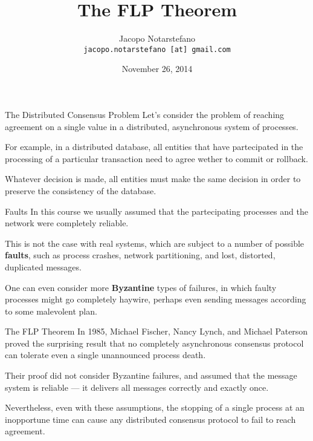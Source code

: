 \documentclass[12pt]{beamer}
\title{The FLP Theorem}
\author[Jacopo Notarstefano]{
  Jacopo Notarstefano\\
  \texttt{jacopo.notarstefano [at] gmail.com}
}
\date{November 26, 2014}
\begin{document}
  \begin{frame}[plain]
    \titlepage
  \end{frame}

  \begin{frame}{The Distributed Consensus Problem}
    Let's consider the problem of reaching agreement on a single value in a distributed, asynchronous system of processes.

    \vspace{0.25cm}

    For example, in a distributed database, all entities that have partecipated in the processing of a particular transaction need to agree wether to commit or rollback.

    \vspace{0.25cm}

    Whatever decision is made, all entities must make the same decision in order to preserve the consistency of the database.
  \end{frame}

  \begin{frame}{Faults}
    In this course we usually assumed that the partecipating processes and the network were completely reliable.

    \vspace{0.25cm}

    This is not the case with real systems, which are subject to a number of possible \textbf{faults}, such as process crashes, network partitioning, and lost, distorted, duplicated messages.

    \vspace{0.25cm}

    One can even consider more \textbf{Byzantine} types of failures, in which faulty processes might go completely haywire, perhaps even sending messages according to some malevolent plan.
  \end{frame}

  \begin{frame}{The FLP Theorem}
    In 1985, Michael Fischer, Nancy Lynch, and Michael Paterson proved the surprising result that no completely asynchronous consensus protocol can tolerate even a single unannounced process death.

    \vspace{0.25cm}

    Their proof did not consider Byzantine failures, and assumed that the message system is reliable — it delivers all messages correctly and exactly once.

    \vspace{0.25cm}

    Nevertheless, even with these assumptions, the stopping of a single process at an inopportune time can cause any distributed consensus protocol to fail to reach agreement.
  \end{frame}
\end{document}
